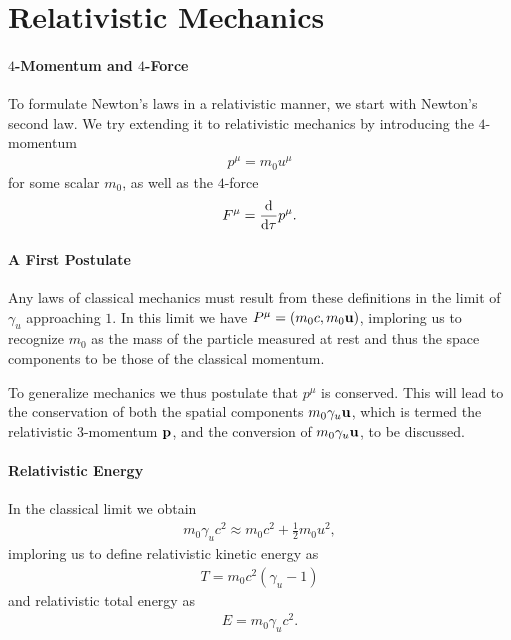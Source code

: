 \section{Relativistic Mechanics}

\paragraph{$4$-Momentum and $4$-Force}
To formulate Newton's laws in a relativistic manner, we start with Newton's second law. We try extending it to relativistic mechanics by introducing the $4$-momentum
\begin{align*}
	p^{\mu} = m_{0}u^{\mu}
\end{align*}
for some scalar $m_{0}$, as well as the $4$-force
\begin{align*}
	F^{\mu} = \dv{\tau}p^{\mu}.
\end{align*}

\paragraph{A First Postulate}
Any laws of classical mechanics must result from these definitions in the limit of $\gamma_{u}$ approaching $1$. In this limit we have $P^{\mu} = (m_{0}c, m_{0}\vb{u})$, imploring us to recognize $m_{0}$ as the mass of the particle measured at rest and thus the space components to be those of the classical momentum.

To generalize mechanics we thus postulate that $p^{\mu}$ is conserved. This will lead to the conservation of both the spatial components $m_{0}\gamma_{u}\vb{u}$, which is termed the relativistic $3$-momentum $\vb{p}$, and the conversion of $m_{0}\gamma_{u}\vb{u}$, to be discussed.

\paragraph{Relativistic Energy}
In the classical limit we obtain
\begin{align*}
	m_{0}\gamma_{u}c^{2} \approx m_{0}c^{2} + \frac{1}{2}m_{0}u^{2},
\end{align*}
imploring us to define relativistic kinetic energy as
\begin{align*}
	T = m_{0}c^{2}(\gamma_{u} - 1)
\end{align*}
and relativistic total energy as
\begin{align*}
	E = m_{0}\gamma_{u}c^{2}.
\end{align*}

